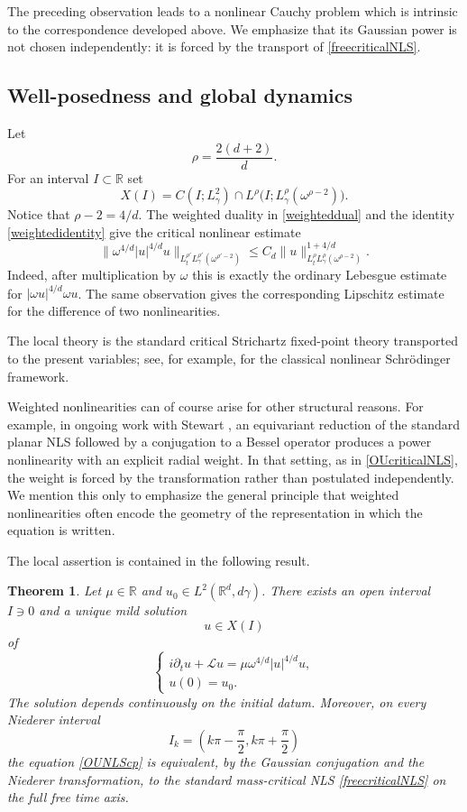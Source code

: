 \documentclass[11pt,a4paper]{amsart}
\newcommand{\Rm}{\mathbb R^d}
\numberwithin{equation}{section}
\newtheorem{theorem}{Theorem}[section]
\numberwithin{equation}{section}
\begin{document}
The preceding observation leads to a nonlinear Cauchy problem which is intrinsic to the correspondence developed above.  We emphasize that its Gaussian power is not chosen independently: it is forced by the transport of \eqref{freecriticalNLS}.

\subsection{Well-posedness and global dynamics}\label{S:OUNLS}
Let
\[
 \rho=\frac{2(d+2)}{d}.
\]
For an interval $I\subset\mathbb R$ set
\[
 X(I)=C(I;L^2_\gamma)\cap L^\rho\bigl(I;L^\rho_\gamma(\omega^{\rho-2})\bigr).
\]
Notice that $\rho-2=4/d$.  The weighted duality in \eqref{weighteddual} and the identity \eqref{weightedidentity} give the critical nonlinear estimate
\begin{equation}\label{OUNLestimate}
 \|\omega^{4/d}|u|^{4/d}u\|_{L^{\rho'}_tL^{\rho'}_\gamma(\omega^{\rho'-2})}
 \leq C_d\|u\|_{L^\rho_tL^\rho_\gamma(\omega^{\rho-2})}^{1+4/d}.
\end{equation}
Indeed, after multiplication by $\omega$ this is exactly the ordinary Lebesgue estimate for $|\omega u|^{4/d}\omega u$.  The same observation gives the corresponding Lipschitz estimate for the difference of two nonlinearities.

The local theory is the standard critical Strichartz fixed-point theory transported to the present variables; see, for example, \cite{GV,GVstrich,Caze} for the classical nonlinear Schr\"odinger framework.

Weighted nonlinearities can of course arise for other structural reasons.  For example, in ongoing work with Stewart \cite{GSprep}, an equivariant reduction of the standard planar NLS followed by a conjugation to a Bessel operator produces a power nonlinearity with an explicit radial weight.  In that setting, as in \eqref{OUcriticalNLS}, the weight is forced by the transformation rather than postulated independently.  We mention this only to emphasize the general principle that weighted nonlinearities often encode the geometry of the representation in which the equation is written.

The local assertion is contained in the following result.

\begin{theorem}\label{T:OUNLSlwp}
Let $\mu\in\mathbb R$ and $u_0\in L^2(\Rm,d\gamma)$.  There exists an open interval $I\ni0$ and a unique mild solution
\[
 u\in X(I)
\]
of
\begin{equation}\label{OUNLScp}
 \begin{cases}
 i\partial_tu+\mathscr Lu=\mu\omega^{4/d}|u|^{4/d}u,\\
 u(0)=u_0.
 \end{cases}
\end{equation}
The solution depends continuously on the initial datum.  Moreover, on every Niederer interval
\[
 I_k=\left(k\pi-\frac{\pi}{2},k\pi+\frac{\pi}{2}\right)
\]
the equation \eqref{OUNLScp} is equivalent, by the Gaussian conjugation and the Niederer transformation, to the standard mass-critical NLS \eqref{freecriticalNLS} on the full free time axis.
\end{theorem}
\end{document}
